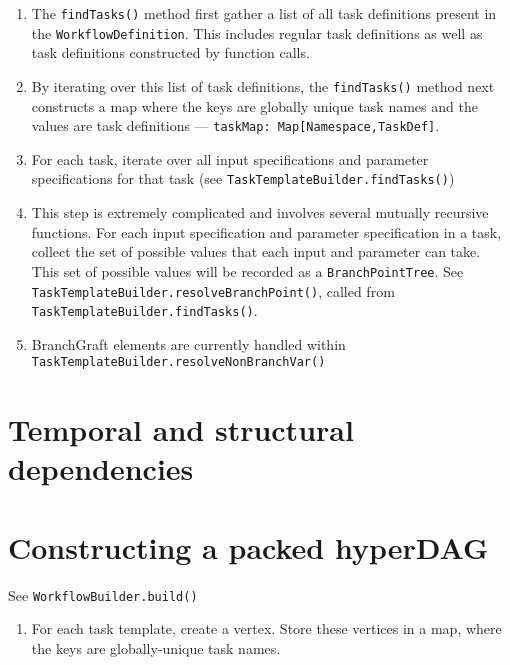 \documentclass{report}
\begin{document}
\begin{enumerate}

\item The \texttt{findTasks()} method first gather a list of all task definitions present in the \texttt{WorkflowDefinition}. This includes regular task definitions as well as task definitions constructed by function calls.

\item By iterating over this list of task definitions, the \texttt{findTasks()} method next constructs a map where 
      the keys are globally unique task names and 
      the values are task definitions --- \texttt{taskMap: Map[Namespace,TaskDef]}.

\item For each task, iterate over all input specifications and parameter specifications for that task
      (see \texttt{TaskTemplateBuilder.findTasks()})

\item This step is extremely complicated and involves several mutually recursive functions.
      For each input specification and parameter specification in a task, 
      collect the set of possible values that each input and parameter can take. 
      This set of possible values will be recorded as a \texttt{BranchPointTree}.
      See \texttt{TaskTemplateBuilder.resolveBranchPoint()}, called from \texttt{TaskTemplateBuilder.findTasks()}.
      
\item BranchGraft elements are currently handled within \texttt{TaskTemplateBuilder.resolveNonBranchVar()}

\end{enumerate}


\section{Temporal and structural dependencies}

\section{Constructing a packed hyperDAG}

See \texttt{WorkflowBuilder.build()}

\begin{enumerate}
\item For each task template, create a vertex. Store these vertices in a map, where the keys are globally-unique task names.
\end{enumerate}




\end{document}
